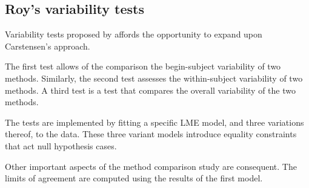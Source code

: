 \documentclass[12pt, a4paper]{report}
\theoremstyle{plain}
\theoremstyle{definition}
\theoremstyle{remark}
\begin{document}



\newpage
\subsection{Roy's variability tests}
Variability tests proposed by \citet{Roy2009} affords the opportunity to expand upon Carstensen's approach.

The first test allows of the comparison the begin-subject variability of two methods. Similarly, the second test
assesses the within-subject variability of two methods. A third test is a test that compares the overall variability of the two methods.

The tests are implemented by fitting a specific LME model, and three variations thereof, to the data. These three variant models introduce equality constraints that act null hypothesis cases.

Other important aspects of the method comparison study are consequent. The limits of agreement are computed using the results of the first model.





\end{document}
